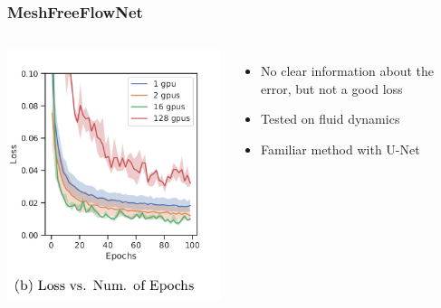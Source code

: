 \documentclass{beamer}
\begin{document}
\begin{frame}
    \frametitle{MeshFreeFlowNet}
\begin{columns}
\includegraphics[scale=0.3]{figures/MeshFreeFlowNet_Error.png}
\begin{itemize}
    \item No clear information about the error, but not a good loss
    \item Tested on fluid dynamics
    \item Familiar method with U-Net
\end{itemize}
\end{columns}
\end{frame}
\end{document}
